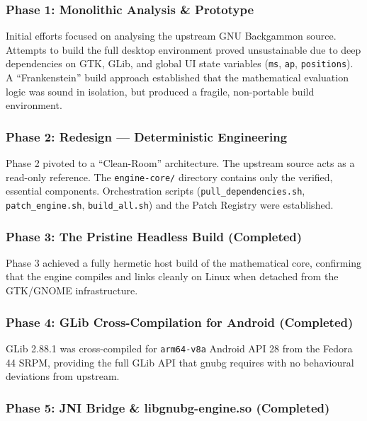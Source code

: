 \documentclass[11pt,a4paper]{article}
\begin{document}
\subsubsection{Phase 1: Monolithic Analysis \& Prototype}\label{phase-1}

Initial efforts focused on analysing the upstream GNU Backgammon source.
Attempts to build the full desktop environment proved unsustainable due
to deep dependencies on GTK, GLib, and global UI state variables
(\texttt{ms}, \texttt{ap}, \texttt{positions}). A ``Frankenstein'' build
approach established that the mathematical evaluation logic was sound in
isolation, but produced a fragile, non-portable build environment.

\subsubsection{Phase 2: Redesign --- Deterministic Engineering}\label{phase-2}

Phase 2 pivoted to a ``Clean-Room'' architecture. The upstream source
acts as a read-only reference. The \texttt{engine-core/} directory
contains only the verified, essential components. Orchestration scripts
(\texttt{pull\_dependencies.sh}, \texttt{patch\_engine.sh},
\texttt{build\_all.sh}) and the Patch Registry were established.

\subsubsection{Phase 3: The Pristine Headless Build (Completed)}\label{phase-3}

Phase 3 achieved a fully hermetic host build of the mathematical core,
confirming that the engine compiles and links cleanly on Linux when
detached from the GTK/GNOME infrastructure.

\subsubsection{Phase 4: GLib Cross-Compilation for Android (Completed)}\label{phase-4}

GLib 2.88.1 was cross-compiled for \texttt{arm64-v8a} Android API 28
from the Fedora 44 SRPM, providing the full GLib API that gnubg requires
with no behavioural deviations from upstream.

\subsubsection{Phase 5: JNI Bridge \& libgnubg-engine.so (Completed)}\label{phase-5}
\end{document}
